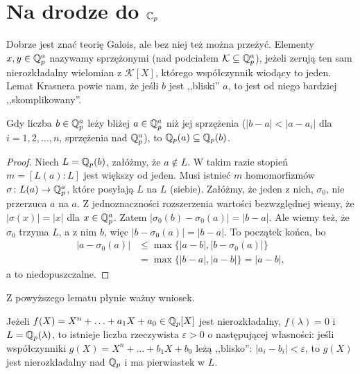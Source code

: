 \section{Na drodze do $\mathbb C_p$}
Dobrze jest znać teorię Galois, ale bez niej też można przeżyć.
Elementy $x, y \in \mathbb Q_p^a$ nazywamy {sprzężonymi} (nad podciałem $\mathcal K \subseteq \mathbb Q_p^a$), jeżeli zerują ten sam nierozkładalny wielomian z $\mathcal K[X]$, którego współczynnik wiodący to jeden.
Lemat Krasnera powie nam, że jeśli $b$ jest ,,bliski'' $a$, to jest od niego bardziej ,,skomplikowany''.

\begin{twierdzenie}
	Gdy liczba $b \in \mathbb Q_p^a$ leży bliżej $a  \in \mathbb Q_p^a$ niż jej sprzężenia ($|b-a| < |a - a_i|$ dla $i = 1, 2, \dots, n$, sprzężenia nad $\mathbb Q_p^a$), to $\mathbb Q_p(a) \subseteq \mathbb Q_p(b)$.
\end{twierdzenie}

\begin{proof}
	Niech $L = \mathbb Q_p(b)$, załóżmy, że $a \not \in L$.
	W takim razie stopień $m = [L(a) : L]$ jest większy od jeden.
	Musi istnieć $m$ homomorfizmów $\sigma \colon L(a) \to \mathbb Q_p^a$, które posyłają $L$ na $L$ (siebie).
	Załóżmy, że jeden z nich, $\sigma_0$, nie przerzuca $a$ na $a$.
	Z jednoznaczności rozszerzenia wartości bezwzględnej wiemy, że $|\sigma(x)| = |x|$ dla $x \in \mathbb Q_p^a$.
	Zatem $|\sigma_0(b) - \sigma_0(a) | = |b-a|$. Ale wiemy też, że $\sigma_0$ trzyma $L$, a z nim $b$, więc $|b - \sigma_0(a)| = |b-a|$.
	To początek końca, bo
	\begin{align*}
		|a - \sigma_0(a)| & \le \max \{|a-b|, |b-\sigma_0(a)|\}\\
		& = \max \{|b-a|, |a-b|\}= |a-b|,
	\end{align*}
	a to niedopuszczalne.
\end{proof}

Z powyższego lematu płynie ważny wniosek.

\begin{fakt}\label{satis}
	Jeżeli $f(X) = X^n + \ldots + a_1 X + a_0 \in \mathbb Q_p[X]$ jest nierozkładalny, $f(\lambda) = 0$ i $L = \mathbb Q_p(\lambda)$, to istnieje liczba rzeczywista $\varepsilon > 0$ o następującej własności: jeśli współczynniki $g(X) = X^n + \ldots + b_1X + b_0$ leżą ,,blisko'': $|a_i - b_i| < \varepsilon$, to $g(X)$ jest nierozkładalny nad $\mathbb Q_p$ i ma pierwiastek w $L$.
\end{fakt}

